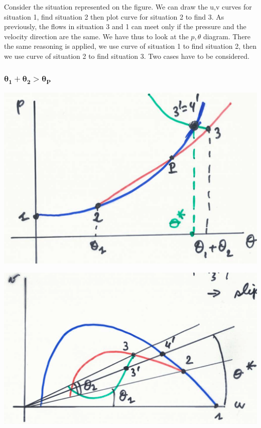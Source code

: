 Consider the situation represented on the figure. We can draw the u,v curves for situation 1, find situation 2 then plot curve for situation 2 to find 3. As previously, the flows in situation 3 and 1 can meet only if the pressure and the velocity direction are the same. We have thus to look at the $p,\theta$ diagram. There the same reasoning is applied, we use curve of situation 1 to find situation 2, then we use curve of situation 2 to find situation 3. Two cases have to be considered.

\subsubsection{$\bm{\theta _1 + \theta _2 > \theta _P}$}
\begin{center}
\begin{minipage}{0.33\textwidth}
\includegraphics[scale=0.1]{ch9/18}
\end{minipage}
\begin{minipage}{0.4\textwidth}
\includegraphics[scale=0.1]{ch9/19}
\end{minipage}
\end{center}

